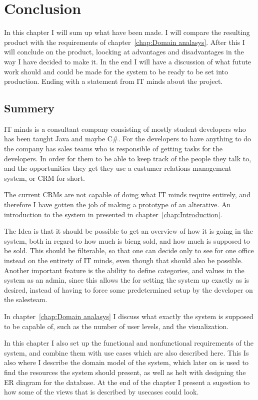 \chapter{Conclusion}
\label{chap:Conclusion}
In this chapter I will sum up what have been made. I will compare the resulting
product with the requirements of chapter~\ref{chap:Domain analasys}. After this
I will conclude on the product, loocking at advantages and disadvantages in the
way I have decided to make it.
In the end I will have a discussion of what futute work should and could be made
for the system to be ready to be set into production. Ending with a statement
from IT minds about the project.

\section{Summery}
IT minds is a consultant company consisting of mostly student developers who has
been taught Java and maybe C\#. For the developers to have anything to do the
company has sales teams who is responsible of getting tasks for the developers.
In order for them to be able to keep track of the people they talk to, and the
opportunities they get they use a custumer relations management system, or CRM
for short. 

The current CRMs are not capable of doing what IT minds require entirely, and
therefore I have gotten the job of making a prototype of an alterative. An
introduction to the system in presented in chapter~\ref{chap:Introduction}.

The Idea is that it should be possible to get an overview of how it is going in
the system, both in regard to how much is bieng sold, and how much is supposed
to be sold. This should be filterable, so that one can decide only to see for
one office instead on the entirety of IT minds, even though that should also be
possible. Another important feature is the ability to define categories, and
values in the system as an admin, since this allows the for setting the system
up exactly as is desired, instead of having to force some predetermined setup by
the developer on the salesteam.

In chapter~\ref{chap:Domain analasys} I discuss what exactly the system is
supposed to be capable of, such as the number of user levels, and the
visualization.

In this chapter I also set up the functional and nonfunctional requirements of
the system, and combine them with use cases which are also described here. This
Is also where I describe the domain model of the system, which later on is used
to find the resources the system should present, as well as helt with designing
the ER diagram for the database. At the end of the chapter I present a sugestion
to how some of the views that is described by usecases could look.

